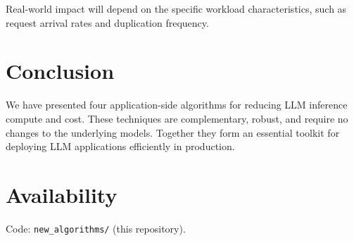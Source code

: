 \documentclass[11pt]{article}
\begin{document}
Real-world impact will depend on the specific workload characteristics, such as request arrival rates and duplication frequency.

\section{Conclusion}
We have presented four application-side algorithms for reducing LLM inference compute and cost. These techniques are complementary, robust, and require no changes to the underlying models. Together they form an essential toolkit for deploying LLM applications efficiently in production.

\section*{Availability}
Code: \texttt{new\_algorithms/} (this repository).



\end{document}

